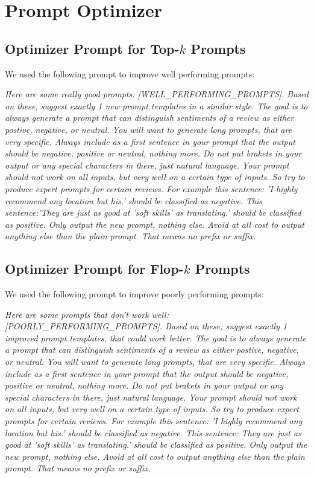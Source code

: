 \documentclass{article}
\theoremstyle{plain}
\theoremstyle{definition}
\theoremstyle{remark}
\begin{document}
\section{Prompt Optimizer}
\label{optimizer_prompt}
\subsection{Optimizer Prompt for Top-$k$ Prompts}
We used the following prompt to improve well performing prompts:

\textit{Here are some really good prompts: [WELL\_PERFORMING\_PROMPTS]. Based on these, suggest exactly 1 new prompt templates in a similar style. The goal is to always generate a prompt that can distinguish sentiments of a review as either postive, negative, or neutral. You will want to generate long prompts, that are very specific. Always include as a first sentence in your prompt that the output should be negative, positive or neutral, nothing more. Do not put brakets in your output or any special characters in there, just natural language. Your prompt should not work on all inputs, but very well on a certain type of inputs. So try to produce expert prompts for certain reviews. For example this sentence: 'I highly recommend any location but his.' should be classified as negative. This sentence:'They are just as good at 'soft skills' as translating.' should be classified as positive. Only output the new prompt, nothing else. Avoid at all cost to output anything else than the plain prompt. That means no prefix or suffix.}

\subsection{Optimizer Prompt for Flop-$k$ Prompts}
We used the following prompt to improve poorly performing prompts:

\textit{Here are some prompts that don't work well: [POORLY\_PERFORMING\_PROMPTS]. Based on these, suggest exactly 1 improved prompt templates, that could work better. The goal is to always generate a prompt that can distinguish sentiments of a review as either postive, negative, or neutral. You will want to generate long prompts, that are very specific. Always include as a first sentence in your prompt that the output should be negative, positive or neutral, nothing more. Do not put brakets in your output or any special characters in there, just natural language. Your prompt should not work on all inputs, but very well on a certain type of inputs. So try to produce expert prompts for certain reviews. For example this sentence: 'I highly recommend any location but his.' should be classified as negative. This sentence: They are just as good at 'soft skills' as translating.' should be classified as positive. Only output the new prompt, nothing else. Avoid at all cost to output anything else than the plain prompt. That means no prefix or suffix.}
\end{document}
